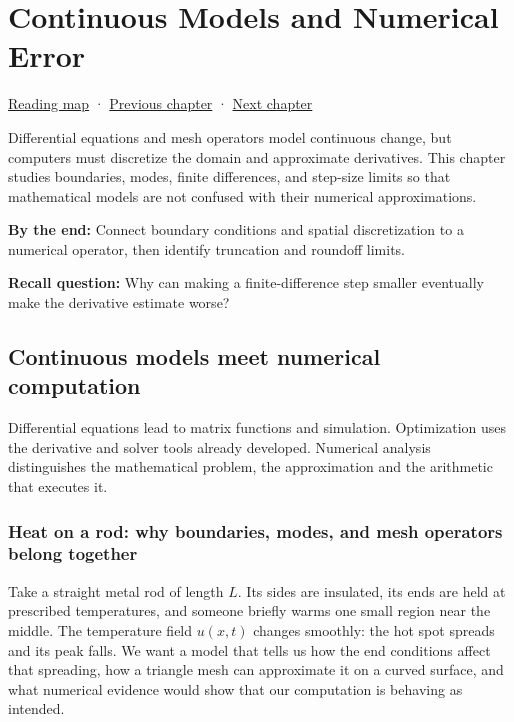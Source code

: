 \hypertarget{02-foundations-ii-ch025}{}
\chapter{Continuous Models and Numerical Error}\label{stagechapter:02-foundations-ii-ch025}\label{02-foundations-ii-ch025-continuous-models-and-numerical-error}

\hyperref[volume-reading-map]{Reading map} · \hyperref[02-foundations-ii-ch024-waiting-times-covariance-and-matrix-decomposition]{Previous chapter} · \hyperref[02-foundations-ii-ch026-matrix-functions-and-nonlinear-least-squares]{Next chapter}

Differential equations and mesh operators model continuous change, but computers must discretize the domain and approximate derivatives. This chapter studies boundaries, modes, finite differences, and step-size limits so that mathematical models are not confused with their numerical approximations.

\textbf{By the end:} Connect boundary conditions and spatial discretization to a numerical operator, then identify truncation and roundoff limits.

\textbf{Recall question:} Why can making a finite-difference step smaller eventually make the derivative estimate worse?

\section{Continuous models meet numerical computation}\label{02-foundations-ii-ch025-continuous-models-meet-numerical-computation}

Differential equations lead to matrix functions and simulation. Optimization uses the derivative and solver tools already developed. Numerical analysis distinguishes the mathematical problem, the approximation and the arithmetic that executes it.

\subsection{Heat on a rod: why boundaries, modes, and mesh operators belong together}\label{02-foundations-ii-ch025-heat-on-a-rod-why-boundaries-modes-and-mesh-operators-belong-together}

Take a straight metal rod of length \(L\). Its sides are insulated, its ends are held at prescribed temperatures, and someone briefly warms one small region near the middle. The temperature field \(u(x,t)\) changes smoothly: the hot spot spreads and its peak falls. We want a model that tells us how the end conditions affect that spreading, how a triangle mesh can approximate it on a curved surface, and what numerical evidence would show that our computation is behaving as intended.

